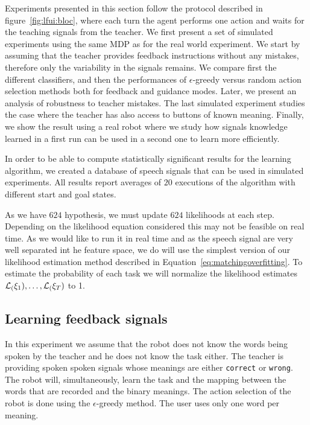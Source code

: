 Experiments presented in this section follow the protocol described in figure~\ref{fig:lfui:bloc}, where each turn the agent performs one action and waits for the teaching signals from the teacher. We first present a set of simulated experiments using the same MDP as for the real world experiment. We start by assuming that the teacher provides feedback instructions without any mistakes, therefore only the variability in the signals remains. We compare first the different classifiers, and then the performances of $\epsilon$-greedy versus random action selection methods both for feedback and guidance modes. Later, we present an analysis of robustness to teacher mistakes. The last simulated experiment studies the case where the teacher has also access to buttons of known meaning. Finally, we show the result using a real robot where we study how signals knowledge learned in a first run can be used in a second one to learn more efficiently.

In order to be able to compute statistically significant results for the learning algorithm, we created a database of speech signals that can be used in simulated experiments. All results report averages of $20$ executions of the algorithm with different start and goal states. 

As we have $624$ hypothesis, we must update $624$ likelihoods at each step. Depending on the likelihood equation considered this may not be feasible on real time. As we would like to run it in real time and as the speech signal are very well separated int he feature space, we do will use the simplest version of our likelihood estimation method described in Equation~\ref{eq:matchingoverfitting}. To estimate the probability of each task we will normalize the likelihood estimates $\mathcal{L}_(\xi_1),\ldots,\mathcal{L}_(\xi_T)$ to 1.

\subsection{Learning feedback signals}

In this experiment we assume that the robot does not know the words being spoken by the teacher and he does not know the task either. The teacher is providing spoken spoken signals whose meanings are either \texttt{correct} or \texttt{wrong}. The robot will, simultaneously, learn the task and the mapping between the words that are recorded and the binary meanings. The action selection of the robot is done using the $\epsilon$-greedy method. The user uses only one word per meaning.


